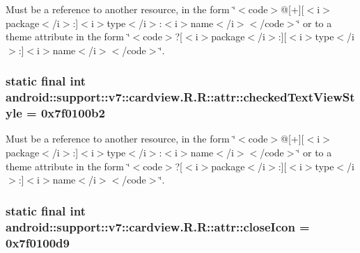 Must be a reference to another resource, in the form \char`\"{}$<$code$>$@\mbox{[}+\mbox{]}\mbox{[}$<$i$>$package$<$/i$>$:\mbox{]}$<$i$>$type$<$/i$>$:$<$i$>$name$<$/i$>$$<$/code$>$\char`\"{} or to a theme attribute in the form \char`\"{}$<$code$>$?\mbox{[}$<$i$>$package$<$/i$>$:\mbox{]}\mbox{[}$<$i$>$type$<$/i$>$:\mbox{]}$<$i$>$name$<$/i$>$$<$/code$>$\char`\"{}. \hypertarget{classandroid_1_1support_1_1v7_1_1cardview_1_1_r_1_1attr_e0470618da8b46fa97b70a67fd597ded}{
\subsubsection[{checkedTextViewStyle}]{\setlength{\rightskip}{0pt plus 5cm}static final int android::support::v7::cardview.R.R::attr::checkedTextViewStyle = 0x7f0100b2}}
\label{classandroid_1_1support_1_1v7_1_1cardview_1_1_r_1_1attr_e0470618da8b46fa97b70a67fd597ded}


Must be a reference to another resource, in the form \char`\"{}$<$code$>$@\mbox{[}+\mbox{]}\mbox{[}$<$i$>$package$<$/i$>$:\mbox{]}$<$i$>$type$<$/i$>$:$<$i$>$name$<$/i$>$$<$/code$>$\char`\"{} or to a theme attribute in the form \char`\"{}$<$code$>$?\mbox{[}$<$i$>$package$<$/i$>$:\mbox{]}\mbox{[}$<$i$>$type$<$/i$>$:\mbox{]}$<$i$>$name$<$/i$>$$<$/code$>$\char`\"{}. \hypertarget{classandroid_1_1support_1_1v7_1_1cardview_1_1_r_1_1attr_67b45a3be19fdf4f3c2628343d8ca619}{
\subsubsection[{closeIcon}]{\setlength{\rightskip}{0pt plus 5cm}static final int android::support::v7::cardview.R.R::attr::closeIcon = 0x7f0100d9}}
\label{classandroid_1_1support_1_1v7_1_1cardview_1_1_r_1_1attr_67b45a3be19fdf4f3c2628343d8ca619}


